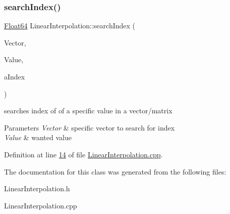 \subsubsection{\texorpdfstring{search\+Index()}{searchIndex()}}
{\footnotesize\ttfamily \hyperlink{group___tools_ga3f1431cb9f76da10f59246d1d743dc2c}{Float64} Linear\+Interpolation\+::search\+Index (\begin{DoxyParamCaption}\item[{Vector\+Xd \&}]{Vector,  }\item[{\hyperlink{group___tools_ga3f1431cb9f76da10f59246d1d743dc2c}{Float64} \&}]{Value,  }\item[{Int32 \&}]{a\+Index }\end{DoxyParamCaption})}



searches index of of a specific value in a vector/matrix 


\begin{DoxyParams}{Parameters}
{\em Vector} & specific vector to search for index \\
\hline
{\em Value} & wanted value \\
\hline
\end{DoxyParams}


Definition at line \hyperlink{_linear_interpolation_8cpp_source_l00014}{14} of file \hyperlink{_linear_interpolation_8cpp_source}{Linear\+Interpolation.\+cpp}.



The documentation for this class was generated from the following files\+:\begin{DoxyCompactItemize}
\item 
Linear\+Interpolation.\+h\item 
Linear\+Interpolation.\+cpp\end{DoxyCompactItemize}
